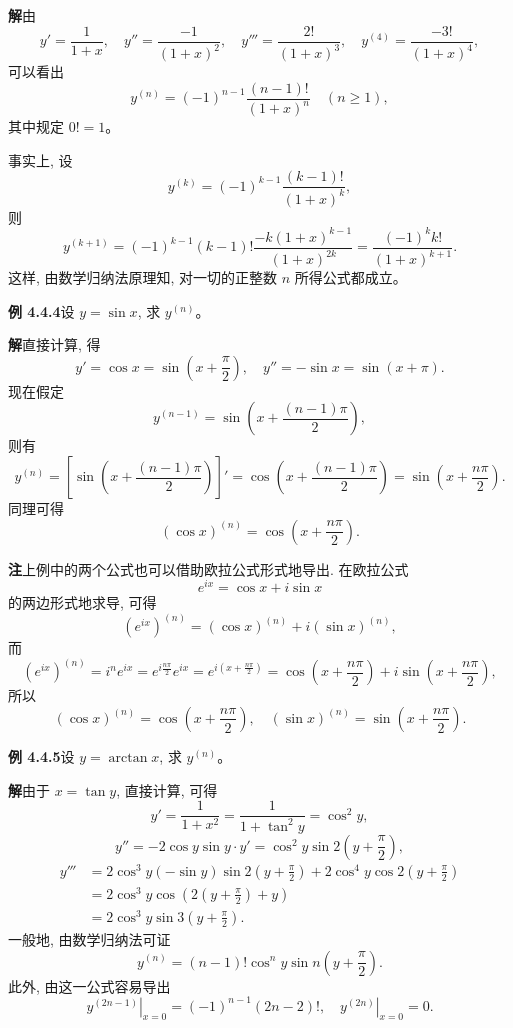 \documentclass[UTF8,12pt,a4paper,fontset=fandol]{ctexart}
\begin{document}
\noindent\textbf{解}\quad 由
\[
  y'=\frac{1}{1+x},\quad
  y''=\frac{-1}{(1+x)^2},\quad
  y'''=\frac{2!}{(1+x)^3},\quad
  y^{(4)}=\frac{-3!}{(1+x)^4},
\]
可以看出
\[
  y^{(n)}
  =
  (-1)^{n-1}\frac{(n-1)!}{(1+x)^n}
  \quad(n\geqslant1),
\]
其中规定 $0!=1$。

事实上, 设
\[
  y^{(k)}
  =
  (-1)^{k-1}\frac{(k-1)!}{(1+x)^k},
\]
则
\[
  y^{(k+1)}
  =
  (-1)^{k-1}(k-1)!\frac{-k(1+x)^{k-1}}{(1+x)^{2k}}
  =
  \frac{(-1)^kk!}{(1+x)^{k+1}}.
\]
这样, 由数学归纳法原理知, 对一切的正整数 $n$ 所得公式都成立。

\noindent\textbf{例 4.4.4}\quad 设 $y=\sin x$, 求 $y^{(n)}$。

\noindent\textbf{解}\quad 直接计算, 得
\[
  y'=\cos x=\sin\left(x+\frac{\pi}{2}\right),
  \quad
  y''=-\sin x=\sin(x+\pi).
\]
现在假定
\[
  y^{(n-1)}
  =
  \sin\left(x+\frac{(n-1)\pi}{2}\right),
\]
则有
\[
  y^{(n)}
  =
  \left[\sin\left(x+\frac{(n-1)\pi}{2}\right)\right]'
  =
  \cos\left(x+\frac{(n-1)\pi}{2}\right)
  =
  \sin\left(x+\frac{n\pi}{2}\right).
\]
同理可得
\[
  (\cos x)^{(n)}
  =
  \cos\left(x+\frac{n\pi}{2}\right).
\]

\noindent\textbf{注}\quad 上例中的两个公式也可以借助欧拉公式形式地导出. 在欧拉公式
\[
  e^{ix}=\cos x+i\sin x
\]
的两边形式地求导, 可得
\[
  (e^{ix})^{(n)}
  =
  (\cos x)^{(n)}+i(\sin x)^{(n)},
\]
而
\[
  (e^{ix})^{(n)}
  =
  i^ne^{ix}
  =
  e^{i\frac{n\pi}{2}}e^{ix}
  =
  e^{i\left(x+\frac{n\pi}{2}\right)}
  =
  \cos\left(x+\frac{n\pi}{2}\right)
  +
  i\sin\left(x+\frac{n\pi}{2}\right),
\]
所以
\[
  (\cos x)^{(n)}
  =
  \cos\left(x+\frac{n\pi}{2}\right),\quad
  (\sin x)^{(n)}
  =
  \sin\left(x+\frac{n\pi}{2}\right).
\]

\noindent\textbf{例 4.4.5}\quad 设 $y=\arctan x$, 求 $y^{(n)}$。

\noindent\textbf{解}\quad 由于 $x=\tan y$, 直接计算, 可得
\[
  y'=\frac{1}{1+x^2}
  =
  \frac{1}{1+\tan^2y}
  =
  \cos^2y,
\]
\[
  y''
  =
  -2\cos y\sin y\cdot y'
  =
  \cos^2y\sin2\left(y+\frac{\pi}{2}\right),
\]
\[
\begin{aligned}
  y'''
  &=
  2\cos^3y(-\sin y)\sin2\left(y+\frac{\pi}{2}\right)
  +
  2\cos^4y\cos2\left(y+\frac{\pi}{2}\right)  \\
  &=
  2\cos^3y\cos\left(2\left(y+\frac{\pi}{2}\right)+y\right)  \\
  &=
  2\cos^3y\sin3\left(y+\frac{\pi}{2}\right).
\end{aligned}
\]
一般地, 由数学归纳法可证
\[
  y^{(n)}
  =
  (n-1)!\cos^ny\sin n\left(y+\frac{\pi}{2}\right).
\]
此外, 由这一公式容易导出
\[
  \left.y^{(2n-1)}\right|_{x=0}
  =
  (-1)^{n-1}(2n-2)!,
  \quad
  \left.y^{(2n)}\right|_{x=0}=0.
\]
\end{document}
